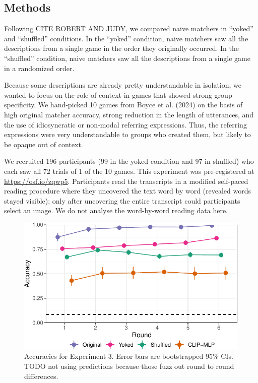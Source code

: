 \documentclass[10pt, letterpaper]{article}
\begin{document}
\subsection{Methods}\label{methods-2}

Following CITE ROBERT AND JUDY, we compared naive matchers in ``yoked''
and ``shuffled'' conditions. In the ``yoked'' condition, naive matchers
saw all the descriptions from a single game in the order they originally
occurred. In the ``shuffled'' condition, naive matchers saw all the
descriptions from a single game in a randomized order.

Because some descriptions are already pretty understandable in
isolation, we wanted to focus on the role of context in games that
showed strong group-specificity. We hand-picked 10 games from Boyce et
al. (2024) on the basis of high original matcher accuracy, strong
reduction in the length of utterances, and the use of idiosyncratic or
non-modal referring expressions. Thus, the referring expressions were
very understandable to groups who created them, but likely to be opaque
out of context.

We recruited 196 participants (99 in the yoked condition and 97 in
shuffled) who each saw all 72 trials of 1 of the 10 games. This
experiment was pre-registered at \url{https://osf.io/zqwp5}.
Participants read the transcripts in a modified self-paced reading
procedure where they uncovered the text word by word (revealed words
stayed visible); only after uncovering the entire transcript could
participants select an image. We do not analyse the word-by-word reading
data here.

\begin{CodeChunk}
\begin{figure}[t]

{\centering \includegraphics[width=0.9\linewidth]{figs/fig-yoked-1} 

}

\caption[Accuracies for Experiment 3]{Accuracies for Experiment 3. Error bars are bootstrapped 95\% CIs. TODO not using predictions because those fuzz out round to round differences. \label{yoked}}\label{fig:fig-yoked}
\end{figure}
\end{CodeChunk}
\end{document}
